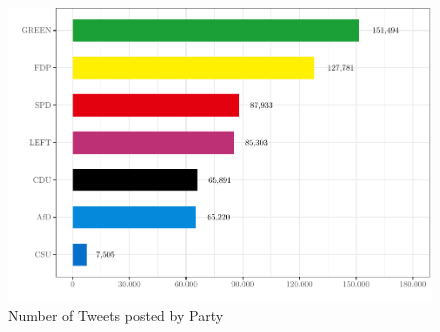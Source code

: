 \documentclass[a4paper,11pt]{article}
\begin{document}
\begin{figure}[H]

\includegraphics[width=0.95\linewidth]{thesis_files/figure-latex/plottweetsamountybyparty-1} \hfill{}

\caption{Number of Tweets posted by Party}\label{fig:plottweetsamountybyparty}
\end{figure}
\newpage
\end{document}
